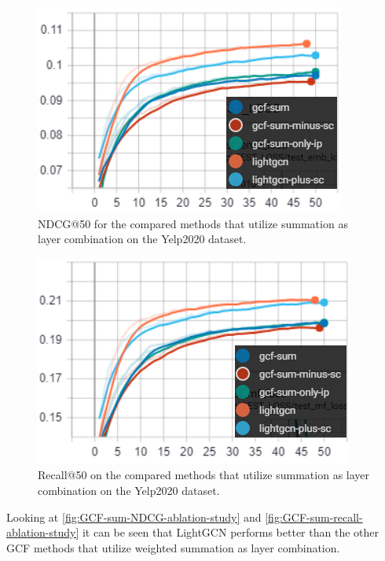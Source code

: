 \begin{figure}[h!]
    \includegraphics[width=\linewidth]{figures/gcf-sum-ndcg.png}
    \caption{NDCG@50 for the compared methods that utilize summation as layer combination on the Yelp2020 dataset.}
    \label{fig:GCF-sum-NDCG-ablation-study}
\end{figure}
\begin{figure}[h!]
    \includegraphics[width=\linewidth]{figures/gcf-sum-recall.png}
    \caption{Recall@50 on the compared methods that utilize summation as layer combination on the Yelp2020 dataset.}
    \label{fig:GCF-sum-recall-ablation-study}
\end{figure}
Looking at \autoref{fig:GCF-sum-NDCG-ablation-study} and \autoref{fig:GCF-sum-recall-ablation-study} it can be seen that LightGCN performs better than the other GCF methods that utilize weighted summation as layer combination.
